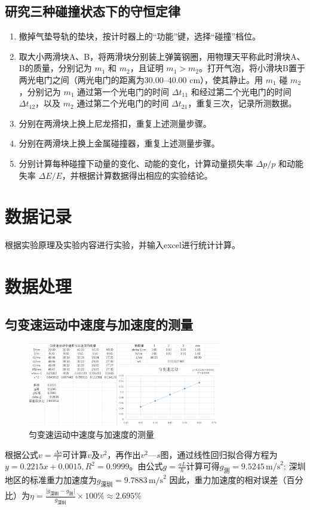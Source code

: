 \documentclass[12pt,a4paper]{article}
\begin{document}
		\subsection{研究三种碰撞状态下的守恒定律}	
			\begin{enumerate}
				\item 撤掉气垫导轨的垫块，按计时器上的“功能”键，选择“碰撞”档位。
				\item 取大小两滑块A、B，将两滑块分别装上弹簧钢圈，用物理天平称此时滑块A、B的质量，分别记为 $m_1$ 和 $m_2$，且证明 $m_1 > m_2$。打开气泡，将小滑块B置于两光电门之间（两光电门的距离为30.00--40.00 cm），使其静止。用 $m_1$ 碰 $m_2$，分别记为 $m_1$ 通过第一个光电门的时间 $\Delta t_{11}$ 和经过第二个光电门的时间 $\Delta t_{12}$，以及 $m_2$ 通过第二个光电门的时间 $\Delta t_{21}$，重复三次，记录所测数据。
				\item 分别在两滑块上换上尼龙搭扣，重复上述测量步骤。
				\item 分别在两滑块上换上金属碰撞器，重复上述测量步骤。
				\item 分别计算每种碰撞下动量的变化、动能的变化，计算动量损失率 $\Delta p/p$ 和动能失率 $\Delta E/E$，并根据计算数据得出相应的实验结论。
			\end{enumerate}
		
	\section{数据记录}
	  根据实验原理及实验内容进行实验，并输入excel进行统计计算。

	\section{数据处理}
	  	\subsection{匀变速运动中速度与加速度的测量}
		  	\begin{figure}[H]
				\centering
				\includegraphics[width=0.75\textwidth]{图1.png}
				\caption{匀变速运动中速度与加速度的测量}
				\label{fig:数据}
	  		\end{figure}
			根据公式$v=\frac{\Delta s}{t}$可计算$v$及$v^2$，再作出$v^2—s$图，通过线性回归拟合得方程为$y=0.2215x+0.0015,R^2=0.9999$。由公式$g = \frac{aL}{h}$计算可得$g_{测}=9.5245\,\text{m/s}^2$;
			深圳地区的标准重力加速度为$g_{深圳}=9.7883\,\text{m/s}^2$
			因此，重力加速度的相对误差（百分比）为$\eta=\frac{\lvert g_{深圳}-g_{测} \rvert}{g_{深圳}}\times 100\% \approx 2.695\%$
			
\end{document}
